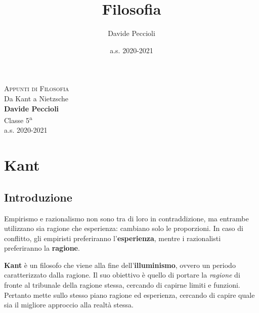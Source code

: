\documentclass[a4paper, twoside, titlepage]{book}
\title{Filosofia}
\author{Davide Peccioli}
\date{a.s. 2020-2021}
\begin{document}
\begin{titlepage} %
\begin{center}
    \null
    \vfill
    {\huge \textsc{Appunti di Filosofia}}\\
    \vspace{2em}
    {\Large Da Kant a Nietzsche}\\
    \vspace{3em}
    {\large \textbf{Davide Peccioli}}\\
    \vspace{1em}
    {\large Classe 5\textsuperscript{a}\\\vspace{0.4em} a.s. 2020-2021}
    \fancyfoot[C]{}
    \vfill
\end{center}
\end{titlepage}
\tableofcontents

\part{Kant}

\chapter*{Introduzione}

Empirismo e razionalismo non sono tra di loro in contraddizione, ma entrambe utilizzano sia ragione che esperienza: cambiano solo le proporzioni. In caso di conflitto, gli empiristi preferiranno l’\textbf{esperienza}, mentre i razionalisti preferiranno la \textbf{ragione}.

\textbf{Kant} è un filosofo che viene alla fine dell’\textbf{illuminismo}, ovvero un periodo caratterizzato dalla ragione. Il suo obiettivo è quello di portare la \textit{ragione} di fronte al tribunale della ragione stessa, cercando di capirne limiti e funzioni.
Pertanto mette sullo stesso piano ragione ed esperienza, cercando di capire quale sia il migliore approccio alla realtà stessa.
\end{document}
